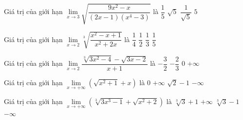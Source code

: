 \begin{ex}%
	Giá trị của giới hạn $\lim\limits_{x\to 3}\sqrt{\dfrac{9x^2-x}{(2x-1)(x^4-3)}}$ là
	\choice
	{$\dfrac{1}{5}$}
	{$\sqrt 5$}
	{\True $\dfrac{1}{\sqrt 5}$}
	{$5$}
\end{ex}

\begin{ex}%
	Giá trị của giới hạn $\lim\limits_{x\to 2}\sqrt[3]{\dfrac{x^2-x+1}{x^2+2x}}$ là
	\choice
	{$\dfrac{1}{4}$}
	{\True $\dfrac{1}{2}$}
	{$\dfrac{1}{3}$}
	{$\dfrac{1}{5}$}
\end{ex}

\begin{ex}%
	Giá trị của giới hạn $\lim\limits_{x\to 2}\dfrac{\sqrt[3]{3x^2-4}-\sqrt{3x-2}}{x+1}$ là
	\choice
	{$-\dfrac{3}{2}$}
	{$-\dfrac{2}{3}$}
	{\True $0$}
	{$+\infty$}
\end{ex}

\begin{ex}%
	Giá trị của giới hạn $\lim\limits_{x\to+\infty}\left(\sqrt{x^2+1}+x\right)$ là
	\choice
	{$0$}
	{\True $+\infty$}
	{$\sqrt 2-1$}
	{$-\infty$}
\end{ex}

\begin{ex}%
	Giá trị của giới hạn $\lim\limits_{x\to+\infty}\left(\sqrt[3]{3x^3-1}+\sqrt{x^2+2}\right)$ là
	\choice
	{$\sqrt[3]{3}+1$}
	{\True $+\infty$}
	{$\sqrt[3]{3}-1$}
	{$-\infty$}
\end{ex}

